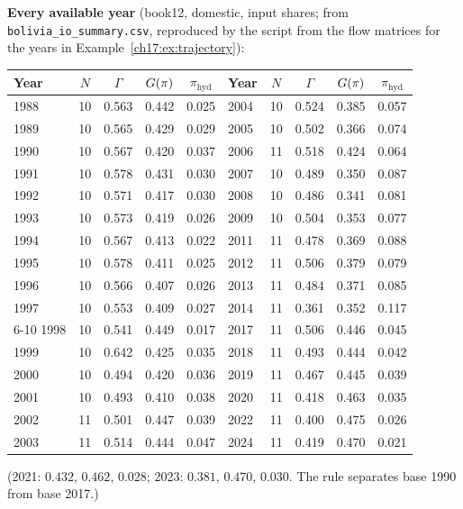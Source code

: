 \documentclass[../solutions_manual.tex]{subfiles}
\begin{document}
 \textbf{Every available year} (book12, domestic, input shares; from \nolinkurl{bolivia_io_summary.csv}, reproduced by the script from the flow matrices for the years in Example~\ref{ch17:ex:trajectory}):
\begin{center}
\scriptsize
\begin{tabular}{lcccc|lcccc}
\toprule
Year & $N$ & $\Gamma$ & $G(\pi)$ & $\pi_{\text{hyd}}$ & Year & $N$ & $\Gamma$ & $G(\pi)$ & $\pi_{\text{hyd}}$ \\
\midrule
1988 & 10 & 0.563 & 0.442 & 0.025 & 2004 & 10 & 0.524 & 0.385 & 0.057 \\
1989 & 10 & 0.565 & 0.429 & 0.029 & 2005 & 10 & 0.502 & 0.366 & 0.074 \\
1990 & 10 & 0.567 & 0.420 & 0.037 & 2006 & 11 & 0.518 & 0.424 & 0.064 \\
1991 & 10 & 0.578 & 0.431 & 0.030 & 2007 & 10 & 0.489 & 0.350 & 0.087 \\
1992 & 10 & 0.571 & 0.417 & 0.030 & 2008 & 10 & 0.486 & 0.341 & 0.081 \\
1993 & 10 & 0.573 & 0.419 & 0.026 & 2009 & 10 & 0.504 & 0.353 & 0.077 \\
1994 & 10 & 0.567 & 0.413 & 0.022 & 2011 & 11 & 0.478 & 0.369 & 0.088 \\
1995 & 10 & 0.578 & 0.411 & 0.025 & 2012 & 11 & 0.506 & 0.379 & 0.079 \\
1996 & 10 & 0.566 & 0.407 & 0.026 & 2013 & 11 & 0.484 & 0.371 & 0.085 \\
1997 & 10 & 0.553 & 0.409 & 0.027 & 2014 & 11 & 0.361 & 0.352 & 0.117 \\
\cmidrule{6-10}
1998 & 10 & 0.541 & 0.449 & 0.017 & 2017 & 11 & 0.506 & 0.446 & 0.045 \\
1999 & 10 & 0.642 & 0.425 & 0.035 & 2018 & 11 & 0.493 & 0.444 & 0.042 \\
2000 & 10 & 0.494 & 0.420 & 0.036 & 2019 & 11 & 0.467 & 0.445 & 0.039 \\
2001 & 10 & 0.493 & 0.410 & 0.038 & 2020 & 11 & 0.418 & 0.463 & 0.035 \\
2002 & 11 & 0.501 & 0.447 & 0.039 & 2022 & 11 & 0.400 & 0.475 & 0.026 \\
2003 & 11 & 0.514 & 0.444 & 0.047 & 2024 & 11 & 0.419 & 0.470 & 0.021 \\
\bottomrule
\end{tabular}
\end{center}
(2021: $0.432$, $0.462$, $0.028$; 2023: $0.381$, $0.470$, $0.030$. The rule separates base 1990 from base 2017.)
\end{document}
